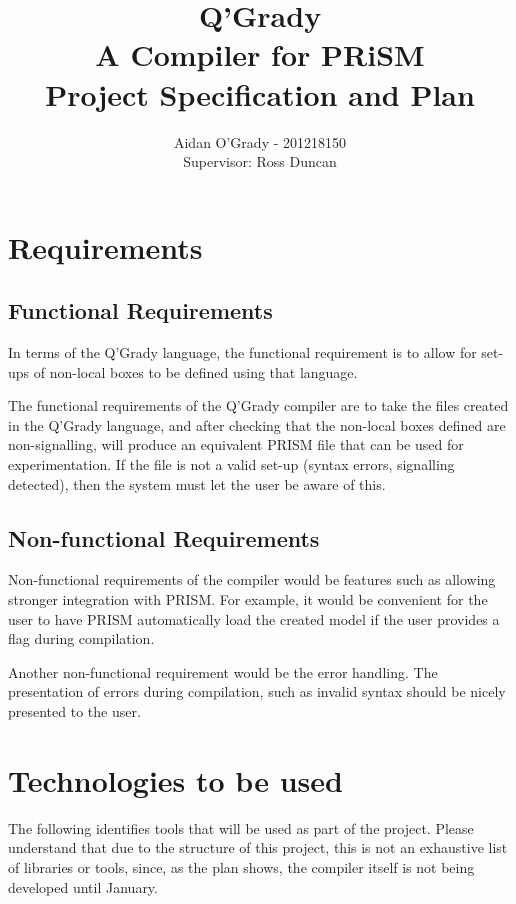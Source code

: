 \documentclass[11pt, a4paper]{article}
\begin{document}
\title{Q'Grady \\A Compiler for PRiSM \\
\large{Project Specification and Plan}}
\author{Aidan O'Grady - 201218150\\Supervisor: Ross Duncan}
\date{}
\maketitle

\section{Requirements} %
\label{sec:requirements}

\subsection{Functional Requirements} %
\label{sub:functional_requirements}
In terms of the Q'Grady language, the functional requirement is to allow for
set-ups of non-local boxes to be defined using that language.

The functional requirements of the Q'Grady compiler are to take the files
created in the Q'Grady language, and after checking that the non-local boxes
defined are non-signalling, will produce an equivalent PRISM file that can
be used for experimentation. If the file is not a valid set-up (syntax errors,
signalling detected), then the system must let the user be aware of this.

\subsection{Non-functional Requirements} %
\label{sub:non_functional_requirements}
Non-functional requirements of the compiler would be features such as allowing
stronger integration with PRISM. For example, it would be convenient for the
user to have PRISM automatically load the created model if the user provides
a flag during compilation.

Another non-functional requirement would be the error handling. The presentation
of errors during compilation, such as invalid syntax should be nicely presented
to the user.

\newpage
\section{Technologies to be used} %
\label{sec:technologies_to_be_used}
The following identifies tools that will be used as part of the project. 
Please understand that due to the structure of this project, this is not an
exhaustive list of libraries or tools, since, as the plan shows, the compiler
itself is not being developed until January.
\end{document}
